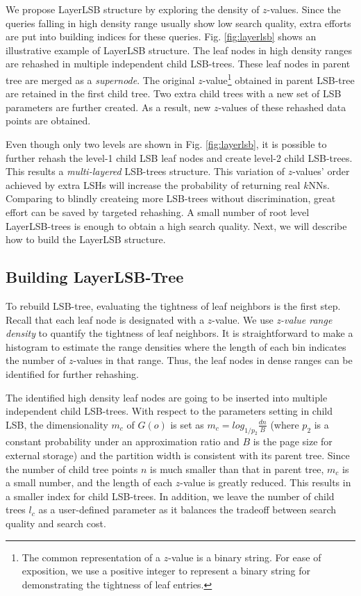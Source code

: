 We propose LayerLSB structure by exploring the density of $z$-values. Since the queries falling in high density range usually show low search quality, extra efforts are put into building indices for these queries. Fig. \ref{fig:layerlsb} shows an illustrative example of LayerLSB structure. The leaf nodes in high density ranges are rehashed in multiple independent child LSB-trees. These leaf nodes in parent tree are merged as a \emph{supernode}. The original $z$-value\footnote{The common representation of a $z$-value is a binary string. For ease of exposition, we use a positive integer to represent a binary string for demonstrating the tightness of leaf entries.} obtained in parent LSB-tree are retained in the first child tree. Two extra child trees with a new set of LSB parameters are further created. As a result, new $z$-values of these rehashed data points are obtained.

Even though only two levels are shown in Fig. \ref{fig:layerlsb}, it is possible to further rehash the level-1 child LSB leaf nodes and create level-2 child LSB-trees. This results a \emph{multi-layered} LSB-trees structure. This variation of $z$-values' order achieved by extra LSHs will increase the probability of returning real $k$NNs. Comparing to blindly createing more LSB-trees without discrimination, great effort can be saved by targeted rehashing. A small number of root level LayerLSB-trees is enough to obtain a high search quality. Next, we will describe how to build the LayerLSB structure.


\subsection{Building LayerLSB-Tree}

 To rebuild LSB-tree, evaluating the tightness of leaf neighbors is the first step. Recall that each leaf node is designated with a $z$-value. We use \emph{z-value range density} to quantify the tightness of leaf neighbors. It is straightforward to make a histogram to estimate the range densities where the length of each bin indicates the number of $z$-values in that range. Thus, the leaf nodes in dense ranges can be identified for further rehashing.

 The identified high density leaf nodes are going to be inserted into multiple independent child LSB-trees. With respect to the parameters setting in child LSB, the dimensionality $m_{c}$ of $G(o)$ is set as $m_{c}=log_{1/p_2}{\frac{dn}{B}}$ (where $p_2$ is a constant probability under an approximation ratio and $B$ is the page size for external storage) \cite{lsb} and the partition width is consistent with its parent tree. Since the number of child tree points $n$ is much smaller than that in parent tree, $m_{c}$ is a small number, and the length of each $z$-value is greatly reduced. This results in a smaller index for child LSB-trees. In addition, we leave the number of child trees $l_{c}$ as a user-defined parameter as it balances the tradeoff between search quality and search cost.

